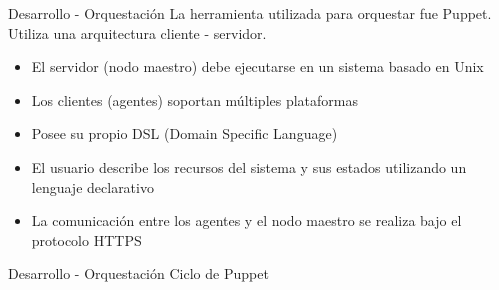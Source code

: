 \begin{frame}{Desarrollo - Orquestación}
    \vspace{-1.5cm}
    La herramienta utilizada para orquestar fue Puppet.
    \\
    Utiliza una arquitectura cliente - servidor.  
    \begin{itemize}
        \item El servidor (nodo maestro) debe ejecutarse en un sistema basado en Unix
        \item Los clientes (agentes) soportan múltiples plataformas
        \item Posee su propio DSL (Domain Specific Language)
        \item El usuario describe los recursos del sistema y sus estados utilizando un lenguaje declarativo  
        \item La comunicación entre los agentes y el nodo maestro se realiza bajo el protocolo HTTPS
    \end{itemize}

\end{frame}


\begin{frame}{Desarrollo - Orquestación}
    \vspace{0cm} {Ciclo de Puppet}
    \vspace{0cm}
        \begin{figure}[ht]
           \centering
        \end{figure}

\end{frame}


